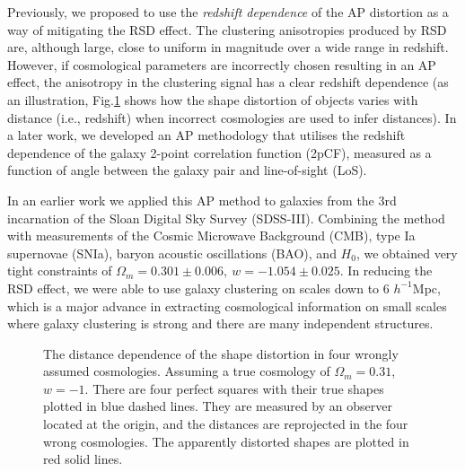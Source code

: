\documentclass[prl,twocolumn,superscriptaddress,aps,amsmath,amssymb,nofootinbib,altaffilletter]{revtex4}
\begin{document}
Previously, we proposed to use the  {\it redshift dependence} of the AP distortion\cite{Li2014} as a way of mitigating the RSD effect. The clustering anisotropies produced by RSD are, although large, close to uniform in magnitude over a wide range in redshift.  However, if cosmological parameters are incorrectly chosen resulting in an AP effect, 
the anisotropy in the clustering signal has a clear redshift dependence
(as an illustration, Fig.\ref{fig_xy} shows how the shape distortion of objects varies with distance (i.e., redshift) 
when incorrect cosmologies are used to infer distances).
In a later work\cite{Li2015}, we developed an AP methodology 
that utilises the redshift dependence of the galaxy 2-point correlation function (2pCF), 
measured as a function of angle between the galaxy pair and line-of-sight (LoS).


In an earlier work\citep{Li2016} we applied this AP method to galaxies from the 3rd incarnation of the Sloan Digital Sky Survey (SDSS-III). 
Combining the method with measurements of the Cosmic Microwave Background (CMB), type Ia supernovae (SNIa), 
baryon acoustic oscillations (BAO), and $H_0$,
we obtained very tight constraints of $ \Omega_m = 0.301 \pm 0.006,\ w=-1.054 \pm 0.025$.
In reducing the RSD effect, 
we were able to use galaxy clustering on scales down to 6 $h^{-1}$Mpc,
which is a major advance in extracting cosmological information 
on small scales where galaxy clustering is strong and there are many independent structures.


\begin{figure}
   \caption{\label{fig_xy}
   The distance dependence of the shape distortion in four wrongly assumed cosmologies.
   Assuming a true cosmology of $\Omega_m=0.31$, $w=-1$.
   There are four perfect squares with their true shapes plotted in blue dashed lines.
   They are measured by an observer located at the origin, and the distances are reprojected in the four wrong cosmologies.
   The apparently distorted shapes are plotted in red solid lines.
   }
\end{figure}
\end{document}
